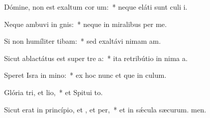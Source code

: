 \item Dómine, non est exaltum cor um:~* neque eláti sunt culi i.
\item Neque ambuvi in gnis:~* neque in miralibus per me.
\item Si non humíliter tibam:~* sed exaltávi nimam am.
\item Sicut ablactátus est super tre a:~* ita retribútio in nima a.
\item Speret Isra in mino:~* ex hoc nunc et que in culum.
\item Glória tri, et lio,~* et Spitui to.
\item Sicut erat in princípio, et , et per,~* et in sǽcula sæcurum. men.
